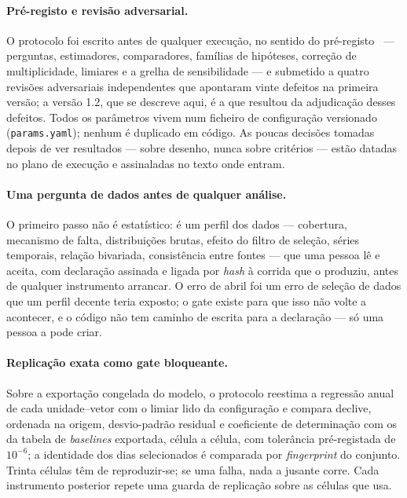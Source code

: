 \paragraph{Pré-registo e revisão adversarial.} O protocolo foi escrito
antes de qualquer execução, no sentido do pré-registo~\cite{Nosek2018} --- perguntas, estimadores, comparadores,
famílias de hipóteses, correção de multiplicidade, limiares e a grelha de
sensibilidade --- e submetido a quatro revisões adversariais independentes
que apontaram vinte defeitos na primeira
versão; a versão 1.2, que se descreve aqui, é a que resultou da
adjudicação desses defeitos. Todos os parâmetros vivem num ficheiro de
configuração versionado (\texttt{params.yaml}); nenhum é duplicado em
código. As poucas decisões tomadas depois de ver resultados --- sobre desenho,
nunca sobre critérios --- estão datadas no plano de execução e assinaladas
no texto onde entram.

\paragraph{Uma pergunta de dados antes de qualquer análise.} O primeiro
passo não é estatístico: é um perfil dos dados --- cobertura, mecanismo de
falta, distribuições brutas, efeito do filtro de seleção, séries temporais,
relação bivariada, consistência entre fontes --- que uma pessoa lê e
aceita, com declaração assinada e ligada por \emph{hash} à corrida que o
produziu, antes de qualquer instrumento arrancar. O erro de abril foi um
erro de seleção de dados que um perfil decente teria exposto; o gate
existe para que isso não volte a acontecer, e o código não tem caminho de
escrita para a declaração --- só uma pessoa a pode criar.

\paragraph{Replicação exata como gate bloqueante.} Sobre a exportação
congelada do modelo, o protocolo reestima a regressão anual de cada
unidade--vetor com o limiar lido da configuração e compara declive,
ordenada na origem, desvio-padrão residual e coeficiente de determinação
com os da tabela de \emph{baselines} exportada, célula a célula, com
tolerância pré-registada de $10^{-6}$; a identidade dos dias selecionados
é comparada por \emph{fingerprint} do conjunto. Trinta células têm de
reproduzir-se; se uma falha, nada a jusante corre. Cada instrumento
posterior repete uma guarda de replicação sobre as células que usa.

